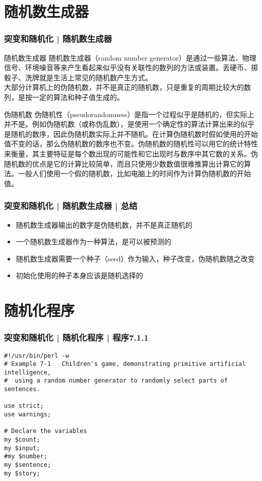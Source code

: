 \section{随机数生成器}
\begin{frame}
  \frametitle{突变和随机化 | 随机数生成器}
  \begin{block}{随机数生成器}
    随机数生成器（random number generator）是通过一些算法、物理信号、环境噪音等来产生看起来似乎没有关联性的数列的方法或装置。丢硬币、掷骰子、洗牌就是生活上常见的随机数产生方式。\\
    大部分计算机上的伪随机数，并不是真正的随机数，只是重复的周期比较大的数列，是按一定的算法和种子值生成的。
  \end{block}
  \pause
  \begin{block}{伪随机数}
    伪随机性（pseudorandomness）是指一个过程似乎是随机的，但实际上并不是。例如伪随机数（或称伪乱数），是使用一个确定性的算法计算出来的似乎是随机的数序，因此伪随机数实际上并不随机。在计算伪随机数时假如使用的开始值不变的话，那么伪随机数的数序也不变。伪随机数的随机性可以用它的统计特性来衡量，其主要特征是每个数出现的可能性和它出现时与数序中其它数的关系。伪随机数的优点是它的计算比较简单，而且只使用少数数值很难推算出计算它的算法。一般人们使用一个假的随机数，比如电脑上的时间作为计算伪随机数的开始值。
  \end{block}
\end{frame}

\begin{frame}
  \frametitle{突变和随机化 | 随机数生成器 | \alert{总结}}
  \begin{itemize}
    \item 随机数生成器输出的数字是伪随机数，并不是真正随机的
    \item 一个随机数生成器作为一种算法，是可以被预测的
    \item 随机数生成器需要一个种子（seed）作为输入，种子改变，伪随机数随之改变
    \item 初始化使用的种子本身应该是随机选择的
  \end{itemize}
\end{frame}

\section{随机化程序}
\begin{frame}[fragile]
  \frametitle{突变和随机化 | 随机化程序 | 程序7.1.1}
\begin{lstlisting}[firstnumber=1,basicstyle=\small\tt]
#!/usr/bin/perl -w
# Example 7-1   Children's game, demonstrating primitive artificial intelligence,
#  using a random number generator to randomly select parts of sentences.

use strict;
use warnings;

# Declare the variables
my $count;
my $input;
#my $number;
my $sentence;
my $story;
\end{lstlisting}
\end{frame}

